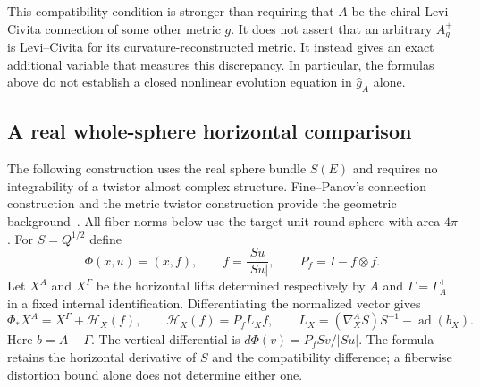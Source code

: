 \documentclass[11pt]{article}
\numberwithin{equation}{section}
\theoremstyle{definition}
\theoremstyle{remark}
\begin{document}
This compatibility condition is stronger than requiring that $A$ be
the chiral Levi--Civita connection of some other metric $g$.
It does not assert that an arbitrary $A_g^+$ is Levi--Civita for its
curvature-reconstructed metric.  It instead gives an exact additional
variable that measures this discrepancy.  In particular, the formulas
above do not establish a closed nonlinear evolution equation in
$\widehat g_A$ alone.


\subsection{A real whole-sphere horizontal comparison}
\label{subsec:real-transport}

The following construction uses the real sphere bundle $S(E)$ and requires
no integrability of a twistor almost complex structure. Fine--Panov's
connection construction and the metric twistor construction provide the
geometric background~\cite{FinePanov2009,AHS1978}.
All fiber norms below use the target unit round sphere with area $4\pi$.
For $S=Q^{1/2}$ define
\[
 \Phi(x,u)=(x,f),\qquad f=\frac{Su}{|Su|},\qquad P_f=I-f\otimes f.
\]
Let $X^A$ and $X^\Gamma$ be the horizontal lifts determined respectively by
$A$ and $\Gamma=\Gamma_A^+$ in a fixed internal identification.
Differentiating the normalized vector gives
\begin{equation}\label{transport:horizontal}
 \Phi_*X^A=X^\Gamma+\mathcal H_X(f),\qquad
 \mathcal H_X(f)=P_f L_Xf,\qquad
 L_X=(\nabla_X^A S)S^{-1}-\operatorname{ad}(b_X).
\end{equation}
Here $b=A-\Gamma$. The vertical differential is
$d\Phi(v)=P_fSv/|Su|$. The formula retains the horizontal derivative of
$S$ and the compatibility difference; a fiberwise distortion bound alone
does not determine either one.
\end{document}
